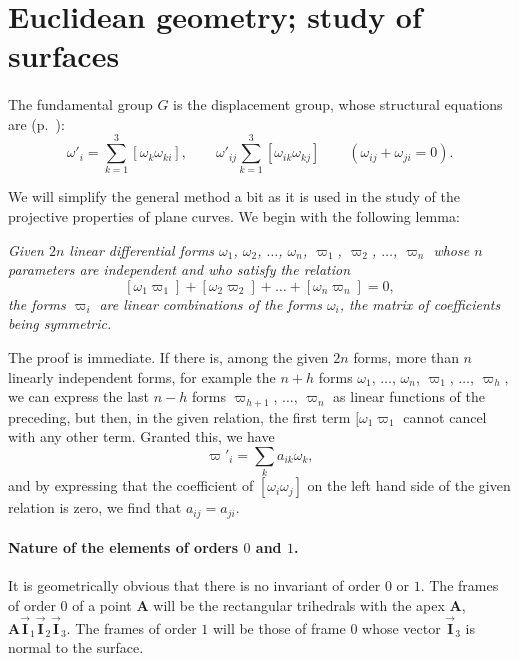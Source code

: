\documentclass[leqno,11pt]{book}
\numberwithin{equation}{chapter}
\theoremstyle{shape1}
\theoremstyle{shapesmall}
\newcommand{\rvec}[1]{\vec{\mathbf{#1}}}
\newcommand{\ivec}{\rvec{I}}
\newcommand{\vp}{\varpi}
\newcommand{\somespace}{\vspace{9pt}}
\begin{document}
\section{Euclidean geometry; study of surfaces}
\label{sec:eucl-geom-study}

\paragraph{}
\label{sec:185}
The fundamental group $G$ is the displacement group, whose structural equations are (p.~\pageref{sec:160}):
  \begin{equation}
    \label{eq:12.16}
    \omega'_{i}=\sum_{k=1}^{3}[\omega_{k}\omega_{ki}],\qquad\omega'_{ij}\sum_{k=1}^{3}[\omega_{ik}\omega_{kj}]\qquad(\omega_{ij}+\omega_{ji}=0).
  \end{equation}

We will simplify the general method a bit as it is used in the study of the projective properties of plane curves. We begin with the following lemma:

\somespace

\emph{Given $2n$ linear differential forms $\omega_{1}$, $\omega_{2}$, $\dots$, $\omega_{n}$, $\vp_{1}$, $\vp_{2}$, $\dots$, $\vp_{n}$ whose $n$ parameters are independent and who satisfy the relation}
\[
[\omega_{1}\vp_{1}]+[\omega_{2}\vp_{2}]+\dots+[\omega_{n}\vp_{n}]=0,
\]
\emph{the forms $\vp_{i}$ are linear combinations of the forms $\omega_{i}$, the matrix of coefficients being symmetric.}

\somespace

The proof is immediate. If there is, among the given $2n$ forms, more than $n$ linearly independent forms, for example the $n+h$ forms $\omega_{1}$, $\dots$, $\omega_{n}$, $\vp_{1}$, $\dots$, $\vp_{h}$, we can express the last $n-h$ forms $\vp_{h+1}$, $\dots$, $\vp_{n}$ as linear functions of the preceding, but then, in the given relation, the first term $[\omega_{1}\vp_{1}$ cannot cancel with any other term. Granted this, we have
\[
\vp'_{i}=\sum_{k}a_{ik}\omega_{k},
\]
and by expressing that the coefficient of $[\omega_{i}\omega_{j}]$ on the left hand side of the given relation is zero, we find that $a_{ij}=a_{ji}$.

\paragraph{Nature of the elements of orders $0$ and $1$.}
\label{sec:186}
It is geometrically obvious that there is no invariant of order $0$ or $1$. The frames of order $0$ of a point $\mathbf{A}$ will be the rectangular trihedrals with the apex $\mathbf{A}$, $\mathbf{A}\ivec_{1}\ivec_{2}\ivec_{3}$. The frames of order $1$ will be those of frame $0$ whose vector $\ivec_{3}$ is normal to the surface.
\end{document}
